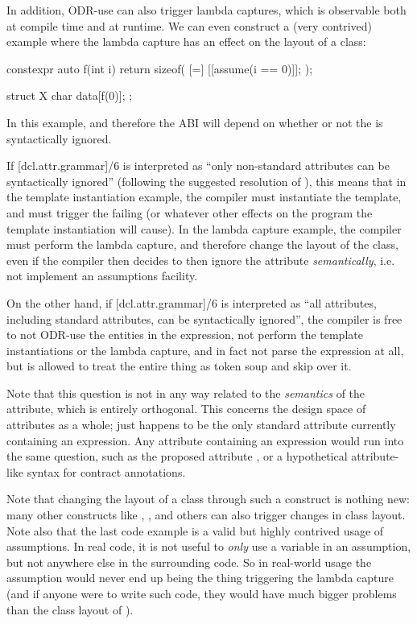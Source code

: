 In addition, ODR-use can also trigger lambda captures, which is observable both at compile time and at runtime. We can even construct a (very contrived) example where the lambda capture has an effect on the layout of a class:

\begin{codeblock}
constexpr auto f(int i) {
  return sizeof( [=] { [[assume(i == 0)]]; } );
}

struct X {
  char data[f(0)];
};
\end{codeblock}

In this example,  and therefore the ABI will depend on whether or not the  is syntactically ignored.

If [dcl.attr.grammar]/6 is interpreted as ``only non-standard attributes can be syntactically ignored'' (following the suggested resolution of \cite{CWG2538}), this means that in the template instantiation example, the compiler must instantiate the template, and must trigger the failing  (or whatever other effects on the program the template instantiation will cause). In the lambda capture example, the compiler must perform the lambda capture, and therefore change the layout of the class, even if the compiler then decides to then ignore the attribute \emph{semantically}, i.e. not implement an assumptions facility.

On the other hand, if [dcl.attr.grammar]/6 is interpreted as ``all attributes, including standard attributes, can be syntactically ignored'', the compiler is free to not ODR-use the entities in the expression, not perform the template instantiations or the lambda capture, and in fact not parse the expression at all, but is allowed to treat the entire thing as token soup and skip over it.

Note that this question is not in any way related to the \emph{semantics} of the  attribute, which is entirely orthogonal. This concerns the design space of attributes as a whole;  just happens to be the only standard attribute currently containing an expression. Any attribute containing an expression would run into the same question, such as the proposed  attribute \cite{P1144R5}, or a hypothetical attribute-like syntax for contract annotations.

Note that changing the layout of a class through such a construct is nothing new: many other constructs like , , and others can also trigger changes in class layout. Note also that the last code example is a valid but highly contrived usage of assumptions. In real code, it is not useful to \emph{only} use a variable in an assumption, but not anywhere else in the surrounding code. So in real-world usage the assumption would never end up being the thing triggering the lambda capture (and if anyone were to write such code, they would have much bigger problems than the class layout of ).


